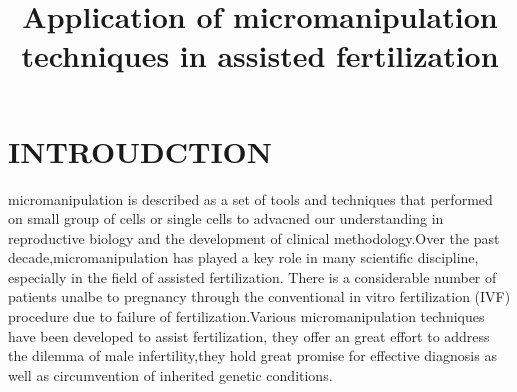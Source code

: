 \documentclass[12pt]{article}
\begin{document}
  
\title{\large Application of micromanipulation techniques in assisted fertilization  \vspace{-2em}}
\date{\vspace{-2.5em}}
\maketitle

\section{INTROUDCTION}
micromanipulation is described as a set of tools and techniques that performed on small group of cells or single cells to advacned our understanding in reproductive biology and the development of clinical
methodology.Over the past decade,micromanipulation has played a key role in many scientific discipline, especially in the field of 
assisted fertilization. There is a considerable number of patients unalbe to pregnancy through the conventional in vitro fertilization (IVF) procedure due to failure of fertilization.Various micromanipulation techniques have been developed to assist fertilization, they offer an great effort to address the dilemma of male infertility,they hold great promise for effective diagnosis as well as circumvention of inherited genetic conditions.\medskip
\end{document}
